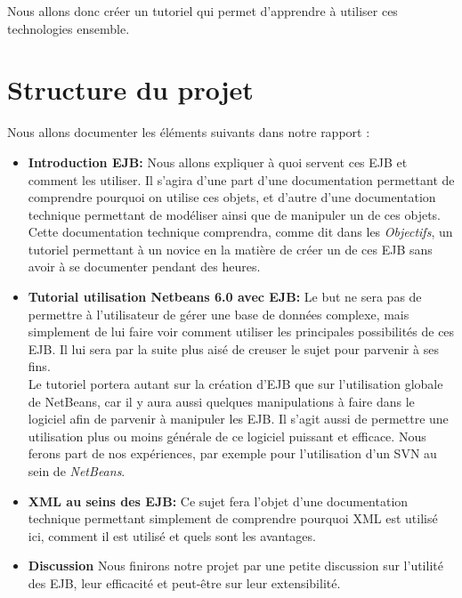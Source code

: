 \documentclass[a4paper, 11pt]{article}
\begin{document}
{	Nous allons donc créer un tutoriel qui permet d'apprendre à utiliser ces technologies ensemble.

\section{Structure du projet}

	Nous allons documenter les éléments suivants dans notre rapport : 
	
	\begin{itemize}

		\item{\textbf{Introduction EJB:}} Nous allons expliquer à quoi servent ces EJB et comment les utiliser. Il s'agira d'une part d'une documentation permettant de comprendre pourquoi on utilise ces objets, et d'autre d'une documentation technique permettant de modéliser ainsi que de manipuler un de ces objets. Cette documentation technique comprendra, comme dit dans les \emph{Objectifs}, un tutoriel permettant à un novice en la matière de créer un de ces EJB sans avoir à se documenter pendant des heures.\\

		\item{\textbf{Tutorial utilisation Netbeans 6.0 avec EJB:}}  Le but ne sera pas de permettre à l'utilisateur de gérer une base de données complexe, mais simplement de lui faire voir comment utiliser les principales possibilités de ces EJB. Il lui sera par la suite plus aisé de creuser le sujet pour parvenir à ses fins.\\

Le tutoriel portera autant sur la création d'EJB que sur l'utilisation globale de NetBeans, car il y aura aussi quelques manipulations à faire dans le logiciel afin de parvenir à manipuler les EJB. Il s'agit aussi de permettre une utilisation plus ou moins générale de ce logiciel puissant et efficace. Nous ferons part de nos expériences, par exemple pour l'utilisation d'un SVN au sein de \emph{NetBeans}.\\

		\item{\textbf{XML au seins des EJB:}}  Ce sujet fera l'objet d'une documentation technique permettant simplement de comprendre pourquoi XML est utilisé ici, comment il est utilisé et quels sont les avantages.\\

		\item{\textbf{Discussion}} Nous finirons notre projet par une petite discussion sur l'utilité des EJB, leur efficacité et peut-être sur leur extensibilité.\\


\end{itemize}}
\end{document}
